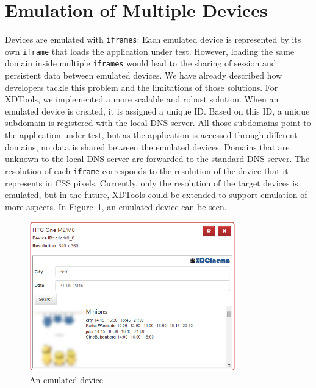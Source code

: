 \section{Emulation of Multiple Devices}

Devices are emulated with \lstinline|iframes|: Each emulated device is represented by its own \lstinline|iframe| that loads the application under test. However, loading the same domain inside multiple \lstinline|iframes| would lead to the sharing of session and persistent data between emulated devices. We have already described how developers tackle this problem and the limitations of those solutions. For XDTools, we implemented a more scalable and robust solution. When an emulated device is created, it is assigned a unique ID. Based on this ID, a unique subdomain is registered with the local DNS server. All those subdomains point to the application under test, but as the application is accessed through different domains, no data is shared between the emulated devices. Domains that are unknown to the local DNS server are forwarded to the standard DNS server. The resolution of each \lstinline|iframe| corresponds to the resolution of the device that it represents in CSS pixels. Currently, only the resolution of the target devices is emulated, but in the future, XDTools could be extended to support emulation of more aspects. In Figure~\ref{fig:emulated_device}, an emulated device can be seen.

\begin{figure}[H]
  \centering
    \includegraphics[width=0.8\textwidth]{images/screenshots/emulated_device_3.png}
	\caption[Screenshot: Emulated device]{An emulated device}
	\label{fig:emulated_device}
\end{figure}

